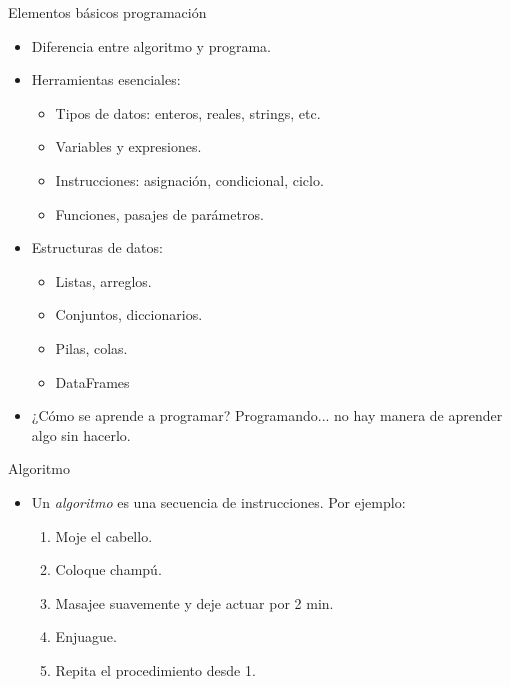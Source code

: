 \documentclass{beamer}
\begin{document}
\begin{frame}{Elementos básicos programación}
\begin{itemize}
	\item Diferencia entre algoritmo y programa.\pause
	\item Herramientas esenciales:
	\begin{itemize}
		\item Tipos de datos: enteros, reales, strings, etc.%
		\item Variables y expresiones.%
		\item Instrucciones: asignación, condicional, ciclo.%
		\item Funciones, pasajes de parámetros.
	\end{itemize}\pause
	\item Estructuras de datos:
	\begin{itemize}
		\item Listas, arreglos.
		\item Conjuntos, diccionarios.
		\item Pilas, colas.
		\item DataFrames
	\end{itemize}\pause
	\item ¿Cómo se aprende a programar? \pause Programando... no hay manera de aprender algo sin hacerlo.
\end{itemize}
\end{frame}




\begin{frame}{Algoritmo} \pause
\begin{itemize}
	\item Un \emph{algoritmo} es una secuencia de instrucciones. Por ejemplo:\pause
		\begin{enumerate}
		\item Moje el cabello. \pause
		\item Coloque champú.\pause
		\item Masajee suavemente y deje actuar por 2 min.\pause
		\item Enjuague. \pause
		\item Repita el procedimiento desde 1.
		\end{enumerate}
\end{itemize}
\end{frame}
\end{document}
